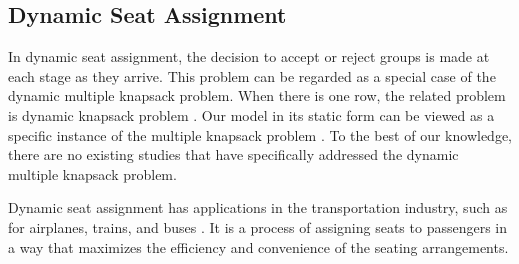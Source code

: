 





\subsection{Dynamic Seat Assignment}
In dynamic seat assignment, the decision to accept or reject groups is made at each stage as they arrive. This problem can be regarded as a special case of the dynamic multiple knapsack problem. When there is one row, the related problem is dynamic knapsack problem \cite{kleywegt1998dynamic}. Our model in its static form can be viewed as a specific instance of the multiple knapsack problem \cite{pisinger1999exact}. To the best of our knowledge, there are no existing studies that have specifically addressed the dynamic multiple knapsack problem.

Dynamic seat assignment has applications in the transportation industry, such as for airplanes, trains, and buses \cite{hamdouch2011schedule, berge1993demand, zhu2023assign}. It is a process of assigning seats to passengers in a way that maximizes the efficiency and convenience of the seating arrangements.

